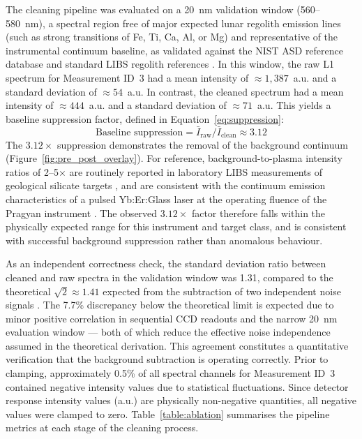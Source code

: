 \documentclass[final,5p,twocolumn,a4paper]{elsarticle}
\begin{document}
The cleaning pipeline was evaluated on a 20~nm validation window (560--580~nm), a spectral region free of major expected lunar regolith emission lines (such as strong transitions of Fe, Ti, Ca, Al, or Mg) and representative of the instrumental continuum baseline, as validated against the NIST ASD reference database \cite{nist_asd} and standard LIBS regolith references \cite{cremers2006libs, sridhar2024libs}. In this window, the raw L1 spectrum for Measurement ID~3 had a mean intensity of $\approx1{,}387$~a.u. and a standard deviation of $\approx54$~a.u. In contrast, the cleaned spectrum had a mean intensity of $\approx444$~a.u. and a standard deviation of $\approx71$~a.u. This yields a baseline suppression factor, defined in Equation~\eqref{eq:suppression}:
\begin{equation}
    \label{eq:suppression}
    \text{Baseline suppression} = \bar{I}_{\mathrm{raw}} / \bar{I}_{\mathrm{clean}} \approx 3.12
\end{equation}
The $3.12\times$ suppression demonstrates the removal of the background continuum (Figure~\ref{fig:pre_post_overlay}). For reference, background-to-plasma intensity ratios of 2--5${\times}$ are routinely reported in laboratory LIBS measurements of geological silicate targets \cite{cremers2006libs}, and are consistent with the continuum emission characteristics of a pulsed Yb:Er:Glass laser at the operating fluence of the Pragyan instrument \cite{sridhar2024libs}. The observed $3.12{\times}$ factor therefore falls within the physically expected range for this instrument and target class, and is consistent with successful background suppression rather than anomalous behaviour.

As an independent correctness check, the standard deviation ratio between cleaned and raw spectra in the validation window was 1.31, compared to the theoretical $\sqrt{2} \approx 1.41$ expected from the subtraction of two independent noise signals \cite{bevington2003data}. The 7.7\% discrepancy below the theoretical limit is expected due to minor positive correlation in sequential CCD readouts and the narrow 20~nm evaluation window --- both of which reduce the effective noise independence assumed in the theoretical derivation. This agreement constitutes a quantitative verification that the background subtraction is operating correctly. Prior to clamping, approximately 0.5\% of all spectral channels for Measurement ID~3 contained negative intensity values due to statistical fluctuations. Since detector response intensity values (a.u.) are physically non-negative quantities, all negative values were clamped to zero. Table~\ref{table:ablation} summarises the pipeline metrics at each stage of the cleaning process.
\end{document}

